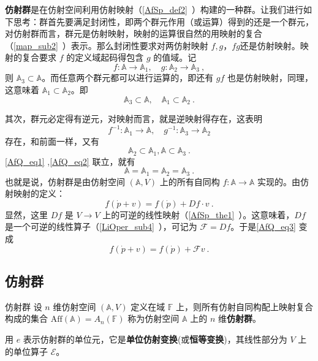 
\textbf{仿射群}是在仿射空间利用仿射映射（\autoref{AfSp_def2}~）构建的一种群。让我们进行如下思考：群首先要满足封闭性，即两个群元作用（或运算）得到的还是一个群元，对仿射群而言，群元是仿射映射，映射的运算很自然的用映射的复合（\autoref{map_sub2}~）表示。那么封闭性要求对两仿射映射 $f,g$，$fg$还是仿射映射。映射的复合要求 $f$ 的定义域起码得包含 $g$ 的值域。记
 \begin{equation}
f:\mathbb A\rightarrow\mathbb A_1,\quad g:\mathbb A_2\rightarrow \mathbb A_3~,
 \end{equation}
 则 $\mathbb A_3\subset \mathbb A$。而任意两个群元都可以进行运算的，即还有 $gf$ 也是仿射映射，同理，这意味着 $\mathbb A_1\subset\mathbb A_2$。即
 \begin{equation}\label{AfQ_eq1}
 \mathbb A_3\subset \mathbb A,\quad \mathbb A_1\subset\mathbb A_2~.
 \end{equation}
 
 其次，群元必定得有逆元，对映射而言，就是逆映射得存在，这表明
\begin{equation}
 f^{-1}:\mathbb A_1\rightarrow\mathbb A,\quad g^{-1}:\mathbb A_3\rightarrow\mathbb A_2
\end{equation}
 存在，和前面一样，又有
 \begin{equation}\label{AfQ_eq2}
 \mathbb A_2\subset \mathbb A_1, \mathbb A\subset\mathbb A_3~.
 \end{equation}
 \autoref{AfQ_eq1} ,\autoref{AfQ_eq2} 联立，就有
 \begin{equation}
 \mathbb A=\mathbb A_1= \mathbb A_2=\mathbb A_3~.
 \end{equation}
 也就是说，仿射群是由仿射空间 $(\mathbb A,V)$ 上的所有自同构 $f:\mathbb A\rightarrow\mathbb A$ 实现的。由仿射映射的定义：
 \begin{equation}\label{AfQ_eq3}
 f(\dot p+v)=f(\dot p)+Df\cdot v~.
 \end{equation}
 显然，这里 $Df$ 是 $V\rightarrow V$ 上的可逆的线性映射（\autoref{AfSp_the1}~）。这意味着，$Df$ 是一个可逆的线性算子（\autoref{LiOper_sub4}~），可记为 $\mathcal F=Df$。于是\autoref{AfQ_eq3} 变成
 \begin{equation}
 f(\dot p+v)=f(\dot p)+\mathcal F v~.
 \end{equation}
 \subsection{仿射群}
 \begin{definition}{仿射群}
 设 $n$ 维仿射空间 $(\mathbb A,V)$ 定义在域 $\mathbb F$ 上，则所有仿射自同构配上映射复合构成的集合 $\mathrm{Aff}(\mathbb A)=A_n(\mathbb F)$ 称为仿射空间 $\mathbb A$ 上的 $n$ 维\textbf{仿射群}。
 \end{definition}
 用 $e$ 表示仿射群的单位元，它是\textbf{单位仿射变换}(或\textbf{恒等变换})，其线性部分为 $V$ 上的单位算子 $\mathcal E$。

